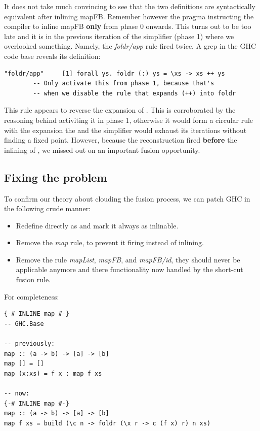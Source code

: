 It does not take much convincing to see that the two definitions are syntactically equivalent after inlining mapFB.
Remember however the pragma instructing the compiler to inline mapFB \textbf{only} from phase 0 onwards. This turns out to be too late
and it is in the previous iteration of the simplifier (phase 1) where we overlooked something. Namely, the \textit{foldr/app} rule fired
twice. A grep in the GHC code base reveals its definition:

\begin{listing}[H]
\begin{verbatim}
"foldr/app"     [1] forall ys. foldr (:) ys = \xs -> xs ++ ys
        -- Only activate this from phase 1, because that's
        -- when we disable the rule that expands (++) into foldr
\end{verbatim}
\end{listing}

This rule appears to reverse the expansion of \mono{++}. This is corroborated by the reasoning behind activiting it in phase 1, otherwise it
would form a circular rule with the expansion the and the simplifier would exhaust its iterations without finding a fixed point. However, because
the reconstruction fired \textbf{before} the inlining of , we missed out on an important fusion opportunity.


\subsection{Fixing the problem}

To confirm our theory about  clouding the fusion process, we can patch GHC in the following crude manner:

\begin{itemize}
  \item Redefine  directly as  and mark it always as inlinable.
  \item Remove the \textit{map} rule, to prevent it firing instead of inlining.
  \item Remove the rule \textit{mapList}, \textit{mapFB}, and \textit{mapFB/id}, they should never be applicable anymore and there functionality
        now handled by the short-cut fusion rule.
\end{itemize}

For completeness:

\begin{listing}[H]
\begin{verbatim}
{-# INLINE map #-}
-- GHC.Base

-- previously:
map :: (a -> b) -> [a] -> [b]
map [] = []
map (x:xs) = f x : map f xs

-- now:
{-# INLINE map #-}
map :: (a -> b) -> [a] -> [b]
map f xs = build (\c n -> foldr (\x r -> c (f x) r) n xs)
\end{verbatim}
\end{listing}

